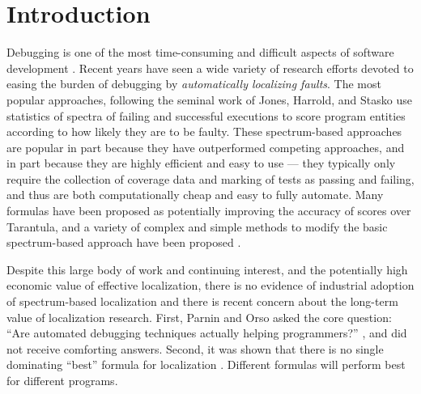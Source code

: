 \section{Introduction}

Debugging is one of the most time-consuming and difficult aspects of
software development \cite{Vesey,BallVis}.  Recent years have seen a
wide variety of research efforts devoted to easing the burden of
debugging by \emph{automatically localizing faults}.  The most popular
approaches, following the seminal work of Jones, Harrold, and Stasko
\cite{Jones2002,Tarantula} use statistics of spectra \cite{RepsSpectra} of
failing and successful executions to score program entities according
to how likely they are to be faulty.  These spectrum-based approaches
are popular in part because they have outperformed competing
approaches, and in part because they are highly efficient and easy to
use --- they typically only require the collection of coverage data
and marking of tests as passing and failing, and thus are both
computationally cheap and easy to fully automate.  Many formulas have
been proposed as potentially improving the accuracy of scores
\cite{Ochai,AMPLE,Pinpoint,StatDebug,Abreu:2006:PRDC} over Tarantula, and a variety of complex
and simple methods to modify the basic spectrum-based approach have
been proposed \cite{Santelices:ICSE:2009,Entropy,CCT}.

Despite this large body of work and continuing interest, and the
potentially high economic value of effective localization, there is no
evidence of industrial adoption of spectrum-based localization
\cite{wopdpanel} and there is recent concern about the long-term value
of localization research.  First, Parnin and Orso asked the core
question: ``Are automated debugging techniques actually helping
programmers?''  \cite{AutoHelp}, and did not receive comforting
answers.  Second, it was shown that there is no single dominating
``best'' formula for localization \cite{yoo2014no}.  Different
formulas will perform best for different programs.  

